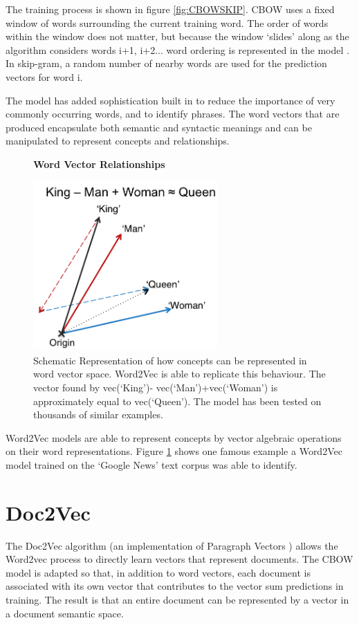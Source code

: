 The training process is shown in figure \ref{fig:CBOWSKIP}. CBOW uses a fixed window of words surrounding the current training word. The order of words within the window does not matter, but because the window `slides' along as the algorithm considers words i+1, i+2... word ordering is represented in the model . In skip-gram, a random number of nearby words are used for the prediction vectors for word i. 

The model has added sophistication built in to reduce the importance of very commonly occurring words, and to identify phrases. The word vectors that are produced encapsulate both semantic and syntactic meanings and can be manipulated to represent concepts and relationships.
\begin{figure}[H]
    \centering
    \textbf{Word Vector Relationships}\par\medskip
    \includegraphics[height=6.5cm]{Natural_Language_Processing/KINGQUEEN.png}
    \caption[Word Vector Relationships]{Schematic Representation of how concepts can be represented in word vector space. Word2Vec is able to replicate this behaviour. The vector found by vec(‘King’)- vec(‘Man’)+vec(‘Woman’) is approximately equal to vec(‘Queen’). The model has been tested on thousands of similar examples\cite{word2vec2}\cite{word2veckingqueen}.}
     \label{fig:KINGQUEEN}
\end{figure}
Word2Vec models are able to represent concepts by vector algebraic operations on their word representations. Figure \ref{fig:KINGQUEEN} shows one famous example a Word2Vec model trained on the `Google News' text corpus was able to identify. 

\section{Doc2Vec}
The Doc2Vec algorithm \cite{gensim}(an implementation of Paragraph Vectors \cite{doc2vec}) allows the Word2vec process to directly learn vectors that represent documents. The CBOW model is adapted so that, in addition to word vectors, each document is associated with its own vector that contributes to the vector sum predictions in training. The result is that an entire document can be represented by a vector in a document semantic space.

